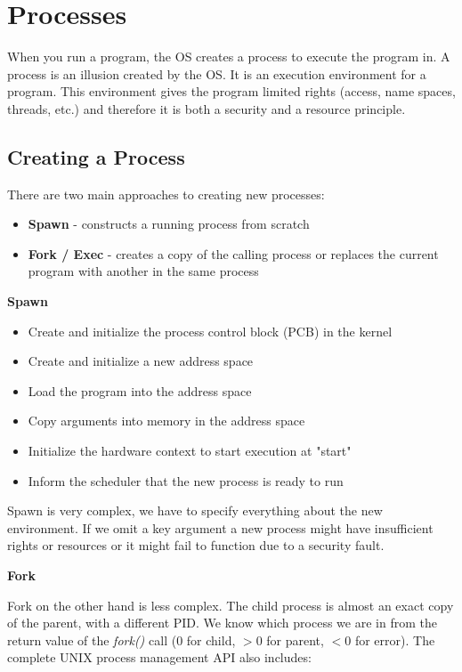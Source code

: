 \section{Processes}

When you run a program, the OS creates a process to execute the program in. A process is an illusion created by the OS. It is an execution environment for a program. This environment gives the program limited rights (access, name spaces, threads, etc.) and therefore it is both a security and a resource principle.


\subsection{Creating a Process}

There are two main approaches to creating new processes:

\begin{itemize}
	\item \textbf{Spawn} - constructs a running process from scratch
	\item \textbf{Fork / Exec} - creates a copy of the calling process or replaces the current program with another in the same process
\end{itemize}

\textbf{Spawn}

\begin{itemize}
	\item Create and initialize the process control block (PCB) in the kernel
	\item Create and initialize a new address space
	\item Load the program into the address space
	\item Copy arguments into memory in the address space
	\item Initialize the hardware context to start execution at "start"
	\item Inform the scheduler that the new process is ready to run
\end{itemize}

Spawn is very complex, we have to specify everything about the new environment. If we omit a key argument a new process might have insufficient rights or resources or it might fail to function due to a security fault. \medskip

\textbf{Fork}

Fork on the other hand is less complex. The child process is almost an exact copy of the parent, with a different PID. We know which process we are in from the return value of the \textit{fork()} call ($0$ for child, $>0$ for parent, $<0$ for error). The complete UNIX process management API also includes:

